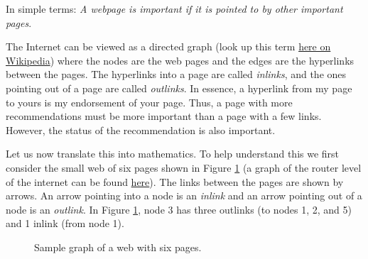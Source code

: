 In simple terms: {\it A webpage is important if it is pointed to by other important
pages}.

The Internet can be viewed as a directed graph (look up this term
\href{https://en.wikipedia.org/wiki/Directed_graph}{here on Wikipedia}) where the nodes
are the web pages and the edges are the hyperlinks between the pages. The hyperlinks into a
page are called {\it inlinks}, and the ones pointing out of a page are called {\it
outlinks}.  In essence, a hyperlink from my page to yours is my endorsement of your page.
Thus, a page with more recommendations must be more important than a page with a few
links.  However, the status of the recommendation is also important. 

Let us now translate this into mathematics. To help understand
this we first consider the small web of six pages shown in Figure
\ref{fig:example_graph} (a graph of the router level of the internet can be found
\href{https://personalpages.manchester.ac.uk/staff/m.dodge/cybergeography/atlas/lumeta_large.jpg}{here}).  The links between the
pages are shown by arrows. An arrow pointing into a node is an {\it inlink}
and an arrow pointing out of a node is an {\it outlink}. In Figure
\ref{fig:example_graph}, node 3 has three outlinks (to nodes 1, 2, and 5)
and 1 inlink (from node 1).

\begin{figure}[ht]
    \begin{center}
    \end{center}
        \caption{Sample graph of a web with six pages.}
        \label{fig:example_graph}
\end{figure}

